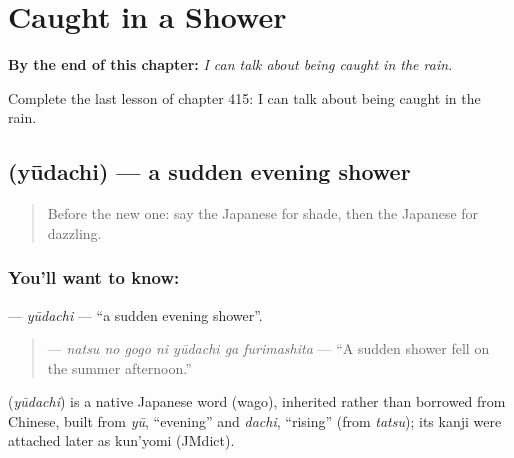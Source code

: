
\chapter{Caught in a Shower}
\label{ch:ja-caught-in-a-shower}

\begin{chapteropening}
\textbf{By the end of this chapter:} \emph{I can talk about being caught in the rain.}

Complete the last lesson of chapter 415: I can talk about being caught in the rain.
\end{chapteropening}

\section[\texorpdfstring{\ja{ゆうだち} (yūdachi)}{ゆうだち (yūdachi)}]{ (yūdachi) — a sudden evening shower}

\label{lesson:JA-C415-yuudachi}



\begin{quote}
Before the new one: say the Japanese for shade, then the Japanese for dazzling.
\end{quote}

\subsection*{You'll want to know: }
\textbf{} — \emph{yūdachi} — \textquotedblleft{}a sudden evening shower\textquotedblright{}.

\begin{quote}
\textbf{   } — \emph{natsu no gogo ni yūdachi ga furimashita} — \textquotedblleft{}A sudden shower fell on the summer afternoon.\textquotedblright{}
\end{quote}

\begin{cousinweb}
\textbf{} (\emph{yūdachi}) is a native Japanese word (wago), inherited rather than borrowed from Chinese, built from \emph{yū}, \textquotedblleft{}evening\textquotedblright{} and \emph{dachi}, \textquotedblleft{}rising\textquotedblright{} (from \emph{tatsu}); its kanji were attached later as kun'yomi (JMdict).
\end{cousinweb}

